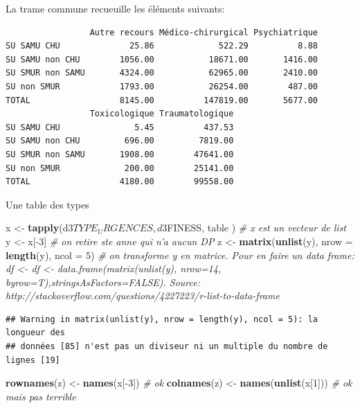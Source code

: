 \documentclass[]{article}
\newenvironment{Shaded}{\begin{snugshade}}{\end{snugshade}}
\newcommand{\KeywordTok}[1]{\textcolor[rgb]{0.13,0.29,0.53}{\textbf{{#1}}}}
\newcommand{\DataTypeTok}[1]{\textcolor[rgb]{0.13,0.29,0.53}{{#1}}}
\newcommand{\DecValTok}[1]{\textcolor[rgb]{0.00,0.00,0.81}{{#1}}}
\newcommand{\StringTok}[1]{\textcolor[rgb]{0.31,0.60,0.02}{{#1}}}
\newcommand{\CommentTok}[1]{\textcolor[rgb]{0.56,0.35,0.01}{\textit{{#1}}}}
\newcommand{\NormalTok}[1]{{#1}}
\begin{document}
La trame commune recueuille les éléments suivants:

\begin{verbatim}
                 Autre recours Médico-chirurgical Psychiatrique
SU SAMU CHU              25.86             522.29          8.88
SU SAMU non CHU        1056.00           18671.00       1416.00
SU SMUR non SAMU       4324.00           62965.00       2410.00
SU non SMUR            1793.00           26254.00        487.00
TOTAL                  8145.00          147819.00       5677.00
                 Toxicologique Traumatologique
SU SAMU CHU               5.45          437.53
SU SAMU non CHU         696.00         7819.00
SU SMUR non SAMU       1908.00        47641.00
SU non SMUR             200.00        25141.00
TOTAL                  4180.00        99558.00
\end{verbatim}

Une table des types

\begin{Shaded}
\begin{Highlighting}[]
\NormalTok{x <-}\StringTok{ }\KeywordTok{tapply}\NormalTok{(d3$TYPE_URGENCES, d3$FINESS, table ) }\CommentTok{# x est un vecteur de list}
\NormalTok{y <-}\StringTok{ }\NormalTok{x[-}\DecValTok{3}\NormalTok{] }\CommentTok{# on retire ste anne qui n'a aucun DP}
\NormalTok{z <-}\StringTok{ }\KeywordTok{matrix}\NormalTok{(}\KeywordTok{unlist}\NormalTok{(y), }\DataTypeTok{nrow =} \KeywordTok{length}\NormalTok{(y), }\DataTypeTok{ncol =} \DecValTok{5}\NormalTok{) }\CommentTok{# on transforme y en matrice. Pour en faire un data frame: df <- df <- data.frame(matrix(unlist(y), nrow=14, byrow=T),stringsAsFactors=FALSE). Source: http://stackoverflow.com/questions/4227223/r-list-to-data-frame}
\end{Highlighting}
\end{Shaded}

\begin{verbatim}
## Warning in matrix(unlist(y), nrow = length(y), ncol = 5): la longueur des
## données [85] n'est pas un diviseur ni un multiple du nombre de lignes [19]
\end{verbatim}

\begin{Shaded}
\begin{Highlighting}[]
\KeywordTok{rownames}\NormalTok{(z) <-}\StringTok{ }\KeywordTok{names}\NormalTok{(x[-}\DecValTok{3}\NormalTok{]) }\CommentTok{# ok}
\KeywordTok{colnames}\NormalTok{(z) <-}\StringTok{ }\KeywordTok{names}\NormalTok{(}\KeywordTok{unlist}\NormalTok{(x[}\DecValTok{1}\NormalTok{])) }\CommentTok{# ok mais pas terrible}
\end{Highlighting}
\end{Shaded}
\end{document}
